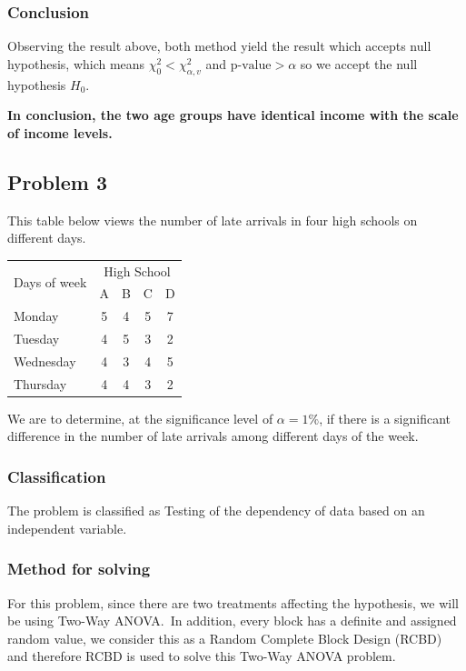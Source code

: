 \documentclass[a4paper]{article}
\numberwithin{equation}{section}
\begin{document}
\subsubsection{Conclusion}
Observing the result above, both method yield the result which accepts null hypothesis, which means \(\chi_0^2 < \chi_{\alpha, v}^2\) and \(\text{p-value} > \alpha \) so we accept the null hypothesis \(H_0\).

\textbf{In conclusion, the two age groups have identical income with the scale of income levels.}

\newpage
\subsection{Problem 3}

This table below views the number of late arrivals in four high schools on different days.

\begin{center}
  \begin{tabular}{l*{4}{c}}
    \toprule
    \multirow{2}{*}{Days of week} & \multicolumn{4}{c}{High School}             \\
    \cmidrule(lr){2-5}            & A                               & B & C & D \\
    \midrule
    Monday                        & 5                               & 4 & 5 & 7 \\
    Tuesday                       & 4                               & 5 & 3 & 2 \\
    Wednesday                     & 4                               & 3 & 4 & 5 \\
    Thursday                      & 4                               & 4 & 3 & 2 \\
    \bottomrule
  \end{tabular}
\end{center}

We are to determine, at the significance level of \( \alpha = 1\% \), if there is a significant difference in the number of late arrivals among different days of the week.

\subsubsection{Classification}
The problem is classified as Testing of the dependency of data based on an independent variable.

\subsubsection{Method for solving}
For this problem, since there are two treatments affecting the hypothesis, we will be using Two-Way ANOVA.\
In addition, every block has a definite and assigned random value, we consider this as a Random Complete Block Design (RCBD) and therefore RCBD is used to solve this Two-Way ANOVA problem.
\end{document}
